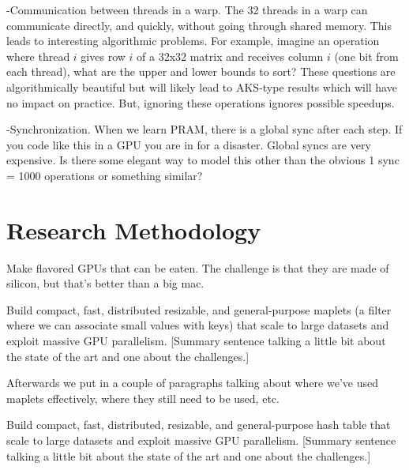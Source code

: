 -Communication between threads in a warp. The 32 threads in a warp can communicate directly, and quickly, without going through shared memory. This leads to interesting algorithmic problems. For example, imagine an operation where thread $i$ gives row $i$ of a 32x32 matrix and receives column $i$ (one bit from each thread), what are the upper and lower bounds to sort? These questions are algorithmically beautiful but will likely lead to AKS-type results which will have no impact on practice. But, ignoring these operations ignores possible speedups.

-Synchronization. When we learn PRAM, there is a global sync after each step. If you code like this in a GPU you are in for a disaster. Global syncs are very expensive. Is there some elegant way to model this other than the obvious 1 sync = 1000 operations or something similar?




\section{Research Methodology}


\begin{rproblem}
Make flavored GPUs that can be eaten. The challenge is that they are made of silicon, but that's better than a big mac.  
\label{rprob:peppermint}
\end{rproblem}

\begin{rproblem}
Build compact, fast, distributed resizable, and general-purpose maplets (a filter where we can associate small values with keys) that scale to large datasets and exploit massive GPU parallelism. 
[Summary sentence talking a little bit about the state of the art and one about the challenges.]
\label{rprob:peppermint}
\end{rproblem}

Afterwards  we put in a couple of paragraphs talking about where we've used maplets effectively, where they still need to be used, etc.

\begin{rproblem}
Build compact, fast, distributed, resizable, and general-purpose hash table that scale to large datasets and exploit massive GPU parallelism. 
[Summary sentence talking a little bit about the state of the art and one about the challenges.]
\label{rprob:peppermint}
\end{rproblem}

